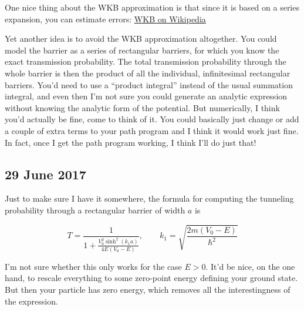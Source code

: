\noindent One nice thing about the WKB approximation is that since it is based on a series expansion, you can estimate errors: \href{https://en.wikipedia.org/wiki/WKB_approximation#Precision_of_the_asymptotic_series}{WKB on Wikipedia}

Yet another idea is to avoid the WKB approximation altogether. You could model the barrier as a series of rectangular barriers, for which you know the exact transmission probability. The total transmission probability through the whole barrier is then the product of all the individual, infinitesimal rectangular barriers. You'd need to use a ``product integral'' instead of the usual summation integral, and even then I'm not sure you could generate an analytic expression without knowing the analytic form of the potential. But numerically, I think you'd actually be fine, come to think of it. You could basically just change or add a couple of extra terms to your path program and I think it would work just fine. In fact, once I get the path program working, I think I'll do just that!

\subsection*{29 June 2017}
Just to make sure I have it somewhere, the formula for computing the tunneling probability through a rectangular barrier of width $a$ is

\begin{equation}
T = \frac{1}{1+\frac{V_0^2\sinh^2(k_1a)}{4E(V_0-E)}}, \qquad k_1 = \sqrt{\frac{2m(V_0-E)}{\hbar^2}}
\end{equation}

I'm not sure whether this only works for the case $E>0$. It'd be nice, on the one hand, to rescale everything to some zero-point energy defining your ground state. But then your particle has zero energy, which removes all the interestingness of the expression.
